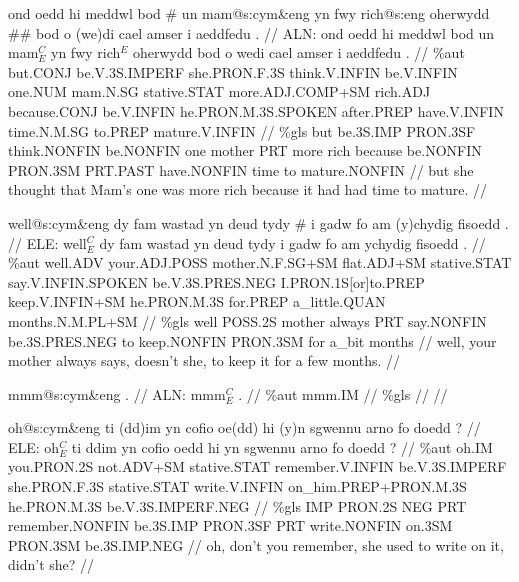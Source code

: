 \documentclass[a4paper,10pt]{article}
\begin{document}
\ex
\begingl[lingstyle=gergl]
\glchat ond oedd hi meddwl bod \# un mam@s:cym\&eng yn fwy rich@s:eng oherwydd \#\# bod o (we)di cael amser i aeddfedu . //
\glsurface ALN:  ond oedd hi meddwl bod un mam$^{C}_{E}$ yn fwy rich$^{E}$ oherwydd bod o wedi cael amser i aeddfedu .  //
\glauto \%aut  but{\scriptsize .CONJ} be{\scriptsize .V.3S.IMPERF} she{\scriptsize .PRON.F.3S} think{\scriptsize .V.INFIN} be{\scriptsize .V.INFIN} one{\scriptsize .NUM} mam{\scriptsize .N.SG} stative{\scriptsize .STAT} more{\scriptsize .ADJ.COMP+SM} rich{\scriptsize .ADJ} because{\scriptsize .CONJ} be{\scriptsize .V.INFIN} he{\scriptsize .PRON.M.3S.SPOKEN} after{\scriptsize .PREP} have{\scriptsize .V.INFIN} time{\scriptsize .N.M.SG} to{\scriptsize .PREP} mature{\scriptsize .V.INFIN}   //
\glmanual \%gls  but be{\scriptsize .3S.IMP} PRON{\scriptsize .3SF} think{\scriptsize .NONFIN} be{\scriptsize .NONFIN} one mother PRT more rich because be{\scriptsize .NONFIN} PRON{\scriptsize .3SM} PRT{\scriptsize .PAST} have{\scriptsize .NONFIN} time to mature{\scriptsize .NONFIN}   //
\gleng but she thought that Mam's one was more rich because it had had time to mature. //
\endgl
\xe

\ex
\begingl[lingstyle=gergl]
\glchat well@s:cym\&eng dy fam wastad yn deud tydy \# i gadw fo am (y)chydig fisoedd . //
\glsurface ELE:  well$^{C}_{E}$ dy fam wastad yn deud tydy i gadw fo am ychydig fisoedd .  //
\glauto \%aut  well{\scriptsize .ADV} your{\scriptsize .ADJ.POSS} mother{\scriptsize .N.F.SG+SM} flat{\scriptsize .ADJ+SM} stative{\scriptsize .STAT} say{\scriptsize .V.INFIN.SPOKEN} be{\scriptsize .V.3S.PRES.NEG} I{\scriptsize .PRON.1S[or]to.PREP} keep{\scriptsize .V.INFIN+SM} he{\scriptsize .PRON.M.3S} for{\scriptsize .PREP} a\_little{\scriptsize .QUAN} months{\scriptsize .N.M.PL+SM}   //
\glmanual \%gls  well POSS{\scriptsize .2S} mother always PRT say{\scriptsize .NONFIN} be{\scriptsize .3S.PRES.NEG} to keep{\scriptsize .NONFIN} PRON{\scriptsize .3SM} for a\_bit months   //
\gleng well, your mother always says, doesn't she, to keep it for a few months. //
\endgl
\xe

\ex
\begingl[lingstyle=gergl]
\glchat mmm@s:cym\&eng . //
\glsurface ALN:  mmm$^{C}_{E}$ .  //
\glauto \%aut  mmm{\scriptsize .IM}   //
\glmanual \%gls     //
\gleng  //
\endgl
\xe

\ex
\begingl[lingstyle=gergl]
\glchat oh@s:cym\&eng ti (dd)im yn cofio oe(dd) hi (y)n sgwennu arno fo doedd ? //
\glsurface ELE:  oh$^{C}_{E}$ ti ddim yn cofio oedd hi yn sgwennu arno fo doedd ?  //
\glauto \%aut  oh{\scriptsize .IM} you{\scriptsize .PRON.2S} not{\scriptsize .ADV+SM} stative{\scriptsize .STAT} remember{\scriptsize .V.INFIN} be{\scriptsize .V.3S.IMPERF} she{\scriptsize .PRON.F.3S} stative{\scriptsize .STAT} write{\scriptsize .V.INFIN} on\_him{\scriptsize .PREP+PRON.M.3S} he{\scriptsize .PRON.M.3S} be{\scriptsize .V.3S.IMPERF.NEG}   //
\glmanual \%gls  IMP PRON{\scriptsize .2S} NEG PRT remember{\scriptsize .NONFIN} be{\scriptsize .3S.IMP} PRON{\scriptsize .3SF} PRT write{\scriptsize .NONFIN} on{\scriptsize .3SM} PRON{\scriptsize .3SM} be{\scriptsize .3S.IMP.NEG}   //
\gleng oh, don't you remember, she used to write on it, didn't she? //
\endgl
\xe
\end{document}
